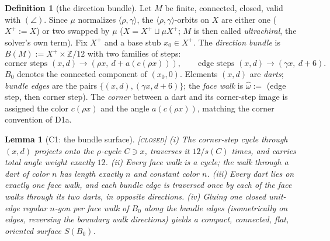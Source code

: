 \documentclass[11pt]{article}
\newtheorem{lemma}[theorem]{Lemma}
\theoremstyle{definition}
\newtheorem{definition}[theorem]{Definition}
\newcommand{\CLOSED}{\textnormal{\textsc{[closed]}}}
\newcommand{\Z}{\mathbb{Z}}
\begin{document}
\begin{definition}[the direction bundle]\label{def:bundle}
Let $M$ be finite, connected, closed, valid with $(\angle)$. Since $\mu$ normalizes
$\langle \rho, \gamma \rangle$, the $\langle \rho, \gamma \rangle$-orbits on $X$ are
either one ($X^+ := X$) or two swapped by $\mu$ ($X = X^+ \sqcup \mu X^+$; $M$ is then
called \emph{ultrachiral}, the solver's own term). Fix $X^+$ and a base stub
$x_0 \in X^+$. The \emph{direction bundle} is $B(M) := X^+ \times \Z/12$ with two
families of steps:
\[
\text{corner steps } (x,d) \to (\rho x,\ d + a(c(\rho x))), \qquad
\text{edge steps } (x,d) \to (\gamma x,\ d + 6).
\]
$B_0$ denotes the connected component of $(x_0, 0)$. Elements $(x,d)$ are \emph{darts};
\emph{bundle edges} are the pairs $\{(x,d), (\gamma x, d+6)\}$; the \emph{face walk} is
$\hat\omega :=$ (edge step, then corner step). The \emph{corner} between a dart and its
corner-step image is assigned the color $c(\rho x)$ and the angle $a(c(\rho x))$,
matching the corner convention of D1a.
\end{definition}

\begin{lemma}[C1: the bundle surface]\label{lem:C1} \CLOSED\;
(i) The corner-step cycle through $(x,d)$ projects onto the $\rho$-cycle $C \ni x$,
traverses it $12/s(C)$ times, and carries total angle weight exactly $12$.
(ii) Every face walk is a cycle; the walk through a dart of color $n$ has length exactly
$n$ and constant color $n$.
(iii) Every dart lies on exactly one face walk, and each bundle edge is traversed once
by each of the face walks through its two darts, in opposite directions.
(iv) Gluing one closed unit-edge regular $n$-gon per face walk of $B_0$ along the bundle
edges (isometrically on edges, reversing the boundary walk directions) yields a compact,
connected, flat, oriented surface $S(B_0)$.
\end{lemma}
\end{document}
